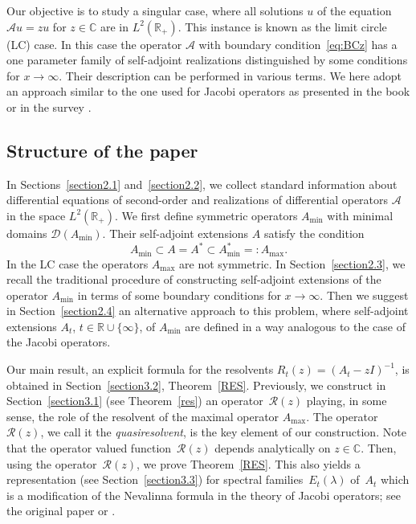 \documentclass[10pt,a4paper]{amsart}
\numberwithin{equation}{section}
\begin{document}
 Our objective is to study a singular case, where all solutions $u$ of the equation ${\mathcal A}u=z u $ for $z\in{\mathbb C}$ are in $L^2 ({\mathbb R}_{+})$. This instance is known as the limit circle (LC) case. In this case the operator ${\mathcal A}$ with boundary condition~\eqref{eq:BCz} has a one parameter family of self-adjoint realizations distinguished by some conditions for $x\to\infty$. Their description can be performed in various terms. We here adopt an approach similar to the one used for Jacobi operators as presented in the book \cite[Section~16.3]{Schm} or in the survey \cite[Section~2]{Simon}.

 \subsection{Structure of the paper}\label{section1.2}

 In Sections~\ref{section2.1} and~\ref{section2.2}, we collect standard information about differential equations of second-order and realizations of differential operators ${\mathcal A}$ in the space $L^2 ({\mathbb R}_{+})$. We first define symmetric operators $A_{\min}$ with minimal domains
 $\mathcal{D}(A_{\min})$. Their self-adjoint extensions $A$ satisfy the condition
 \begin{equation}
A_{\min}\subset A =A^*\subset A_{\min}^*=: A_{\max}.
 \label{eq:Neum3}\end{equation}
In the LC case the operators $A_{\max}$ are not symmetric. In Section~\ref{section2.3}, we recall the traditional procedure of constructing self-adjoint extensions of the operator $A_{\min}$ in terms of some boundary conditions for $x\to\infty$. Then we suggest in Section~\ref{section2.4} an alternative approach to this problem, where self-adjoint extensions $A_{t}$, $t\in {\mathbb R}\cup\{ \infty\}$, of $A_{\min}$ are defined in a way analogous to the case of the Jacobi operators.

Our main result, an explicit formula for the resolvents $R_t (z)= (A_t-zI)^{-1}$, is obtained in Section~\ref{section3.2}, Theorem~\ref{RES}. Previously, we construct in Section~\ref{section3.1} (see Theorem~\ref{res}) an operator~${\mathcal R}(z)$ playing, in some sense, the role of the resolvent of the maximal operator $A_{\max}$. The operator~${\mathcal R}(z)$, we call it the {\it quasiresolvent}, is the key element of our construction.
 Note that the operator valued function~${\mathcal R}(z)$ depends analytically on $z\in{\mathbb C}$. Then, using the operator~${\mathcal R}(z)$, we prove Theorem~\ref{RES}. This also yields a representation (see Section~\ref{section3.3}) for spectral families~$E_{t}(\lambda)$ of~$A_{t}$ which is a modification of the Nevalinna formula in the theory of Jacobi operators; see the original paper \cite{Nevan} or \cite{Schm, Simon}.
\end{document}
